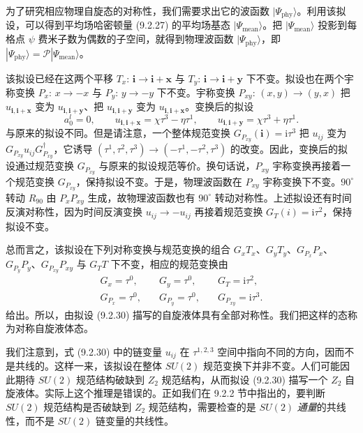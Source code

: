 为了研究相应物理自旋态的对称性，我们需要求出它的波函数 $|\Psi_{\mathrm{phy}}\rangle$。利用该拟设，可以得到平均场哈密顿量 (9.2.27) 的平均场基态 $|\Psi_{\mathrm{mean}}\rangle$。把 $|\Psi_{\mathrm{mean}}\rangle$ 投影到每格点 $\psi$ 费米子数为偶数的子空间，就得到物理波函数 $|\Psi_{\mathrm{phy}}\rangle$，即 $|\Psi_{\mathrm{phy}}\rangle=\mathcal{P}|\Psi_{\mathrm{mean}}\rangle$。

该拟设已经在这两个平移 $T_x:\,\pmb{i}\to\pmb{i}+\pmb{x}$ 与 $T_y:\,\pmb{i}\to\pmb{i}+\pmb{y}$ 下不变。拟设也在两个宇称变换 $P_x:\,x\to-x$ 与 $P_y:\,y\to-y$ 下不变。宇称变换 $P_{xy}:\,(x,y)\to(y,x)$ 把 $u_{\pmb{i},\pmb{i}+\pmb{x}}$ 变为 $u_{\pmb{i},\pmb{i}+\pmb{y}}$、把 $u_{\pmb{i},\pmb{i}+\pmb{y}}$ 变为 $u_{\pmb{i},\pmb{i}+\pmb{x}}$。变换后的拟设
\begin{equation*}
a_0^{l}=0,\qquad u_{\pmb{i},\pmb{i}+\pmb{x}}=\chi\tau^{3}-\eta\tau^{1},\qquad u_{\pmb{i},\pmb{i}+\pmb{y}}=\chi\tau^{3}+\eta\tau^{1}.
\end{equation*}
与原来的拟设不同。但是请注意，一个整体规范变换 $G_{P_{xy}}(\pmb{i})=\mathrm{i}\tau^{3}$ 把 $u_{ij}$ 变为 $G_{P_{xy}}u_{ij}G_{P_{xy}}^{\dagger}$，它诱导 $(\tau^{1},\tau^{2},\tau^{3})\to(-\tau^{1},-\tau^{2},\tau^{3})$ 的改变。因此，变换后的拟设通过规范变换 $G_{P_{xy}}$ 与原来的拟设规范等价。换句话说，$P_{xy}$ 宇称变换再接着一个规范变换 $G_{P_{xy}}$，保持拟设不变。于是，物理波函数在 $P_{xy}$ 宇称变换下不变。$90^{\circ}$ 转动 $R_{90}$ 由 $P_xP_{xy}$ 生成，故物理波函数也有 $90^{\circ}$ 转动对称性。上述拟设还有时间反演对称性，因为时间反演变换 $u_{ij}\to-u_{ij}$ 再接着规范变换 $G_T(i)=\mathrm{i}\tau^{2}$，保持拟设不变。

总而言之，该拟设在下列对称变换与规范变换的组合 $G_xT_x$、$G_yT_y$、$G_{P_x}P_x$、$G_{P_y}P_y$、$G_{P_{xy}}P_{xy}$ 与 $G_TT$ 下不变，相应的规范变换由
\begin{equation*}
\begin{array}{ccc}
G_x=\tau^{0}, & \quad G_y=\tau^{0}, & \quad G_T=\mathrm{i}\tau^{2},\\
G_{P_x}=\tau^{0}, & \quad G_{P_y}=\tau^{0}, & \quad G_{P_{xy}}=\mathrm{i}\tau^{3}.
\end{array}
\tag{9.2.31}
\end{equation*}
给出。所以，由拟设 (9.2.30) 描写的自旋液体具有全部对称性。我们把这样的态称为对称自旋液体态。

我们注意到，式 (9.2.30) 中的链变量 $u_{ij}$ 在 $\tau^{1,2,3}$ 空间中指向不同的方向，因而不是共线的。这样一来，该拟设在整体 $SU(2)$ 规范变换下并非不变。人们可能因此期待 $SU(2)$ 规范结构破缺到 $Z_2$ 规范结构，从而拟设 (9.2.30) 描写一个 $Z_2$ 自旋液体。实际上这个推理是错误的。正如我们在 9.2.2 节中指出的，要判断 $SU(2)$ 规范结构是否破缺到 $Z_2$ 规范结构，需要检查的是 $SU(2)$ \emph{通量}的共线性，而不是 $SU(2)$ 链变量的共线性。

